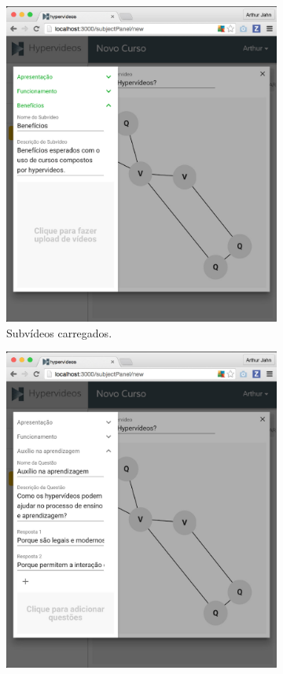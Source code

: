 \begin{figure}[h!]
  	\centering
  	\begin{subfigure}{.5\textwidth}
  		\centering
  		\includegraphics[width=.95\linewidth]{figuras/autoria_construcao_a.eps}
  		\caption{Subvídeos carregados.}
  		\label{fig:autoria_construcao_a}
	\end{subfigure}%
	\begin{subfigure}{.5\textwidth}
  		\centering
  		\includegraphics[width=.95\linewidth]{figuras/autoria_construcao_b.eps}

\end{subfigure}
\end{figure}

